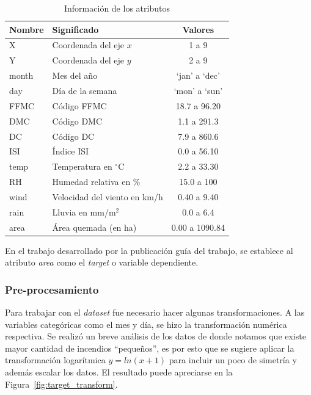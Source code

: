 \documentclass[spanish]{article}
\begin{document}
    \begin{table}[!ht]
    	\centering
      \caption{Información de los atributos}
      \begin{tabular}{llc}
      	\hline
      	Nombre & Significado & Valores \\ \hline \hline
        X & Coordenada del eje $x$ & 1 a 9 \\
        Y & Coordenada del eje $y$ & 2 a 9 \\
        month & Mes del año & `jan' a `dec' \\
        day & Día de la semana & `mon' a `sun' \\ 
        FFMC & Código FFMC  & 18.7 a 96.20 \\
        DMC & Código DMC & 1.1 a 291.3 \\
        DC & Código DC & 7.9 a 860.6 \\
        ISI & Índice ISI  & 0.0 a 56.10 \\
        temp & Temperatura en $^{\circ}$C & 2.2 a 33.30 \\
        RH & Humedad relativa en \% & 15.0 a 100 \\
        wind & Velocidad del viento en km/h & 0.40 a 9.40 \\
        rain & Lluvia en mm/m$^2$ & 0.0 a 6.4 \\
        area & Área quemada (en ha) & 0.00 a 1090.84 \\
        \hline
      \end{tabular}
      \label{tab:attributes}
    \end{table}
    
    En el trabajo desarrollado por la publicación guía del trabajo, se establece al atributo \emph{area}
    como el \emph{target} o variable dependiente.    

    \subsubsection{Pre-procesamiento}

      Para trabajar con el \emph{dataset} fue necesario hacer algunas transformaciones. A las variables
      categóricas como el mes y día, se hizo la transformación numérica respectiva. Se realizó un breve 
      análisis de los datos de donde notamos que existe mayor cantidad de incendios ``pequeños'', es por 
      esto que se sugiere aplicar la transformación logarítmica $y=ln(x+1)$ para incluir un poco de 
      simetría y además escalar los datos. El resultado puede apreciarse en la 
      Figura~\ref{fig:target_transform}.
\end{document}
